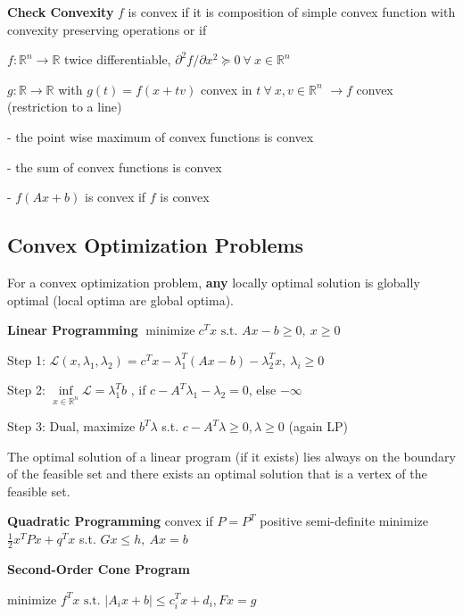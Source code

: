 \textbf{Check Convexity} $f$ is convex if it is
composition of simple convex function
with convexity preserving operations
or if

$f: \mathbb{R}^n \rightarrow \mathbb{R}$ twice differentiable,
$\partial^2f/\partial x^2 \succeq 0\ \forall\ x \in \mathbb{R}^{n}$

$g: \mathbb{R} \rightarrow \mathbb{R}$ with $g(t)=f(x+tv)$
convex in $t\ \forall\ x,v \in \mathbb{R}^{n}$
$\rightarrow f$ convex (restriction to a line)

- the point wise maximum of convex functions is convex

- the sum of convex functions is convex

- $f(Ax+b)$ is convex if $f$ is convex



\subsection{Convex Optimization Problems}

\begin{theorem}
  For a convex optimization problem,
  \textbf{any} locally optimal solution is globally
  optimal (local optima are global optima).
\end{theorem}

\textbf{Linear Programming}
$ \operatorname{minimize} c^T x
\text{ s.t. } Ax-b \ge 0,\ x\ge0$

Step 1:
$\mathcal{L}(x,\lambda_1,\lambda_2) =
c^T x-\lambda_1^T (Ax-b) -\lambda_2^T x,\ \lambda_i \ge0$

Step 2:
$\underset{x \in \mathcal{\mathbb{R}}^n}{\operatorname{inf}}
\mathcal{L}=\lambda_1^T b$
, if $c-A^T\lambda_1-\lambda_2=0$, else $-\infty$

Step 3: Dual,
maximize $b^T\lambda$
s.t.
$c-A^T\lambda\ge0,\lambda\ge0$
(again LP)

\begin{proposition}
  The optimal solution of a linear program (if it exists)
  lies always on the boundary of the feasible set
  and there exists an optimal solution that is a vertex of the feasible set.
\end{proposition}

\textbf{Quadratic Programming}
convex if $P=P^T$ positive semi-definite
minimize $\frac{1}{2}x^T Px+q^T x$
s.t. $Gx\le h,\ Ax=b$

\textbf{Second-Order Cone Program}

minimize $f^T x \text{ s.t. }
|A_ix+b|\le c_i^T x+d_i, Fx=g$

